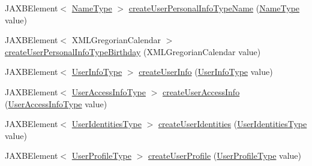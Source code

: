 \begin{DoxyCompactItemize}
\item 
JAXBElement$<$ \hyperlink{classcom_1_1telefonica_1_1schemas_1_1unica_1_1rest_1_1directory_1_1v1_1_1NameType}{NameType} $>$ \hyperlink{classcom_1_1telefonica_1_1schemas_1_1unica_1_1rest_1_1directory_1_1v1_1_1ObjectFactory_a7313963b96c9bc0f9e8525e5dd39c3fe}{createUserPersonalInfoTypeName} (\hyperlink{classcom_1_1telefonica_1_1schemas_1_1unica_1_1rest_1_1directory_1_1v1_1_1NameType}{NameType} value)
\item 
JAXBElement$<$ XMLGregorianCalendar $>$ \hyperlink{classcom_1_1telefonica_1_1schemas_1_1unica_1_1rest_1_1directory_1_1v1_1_1ObjectFactory_ac426ea74a4ed920175dd2dbf23597f1a}{createUserPersonalInfoTypeBirthday} (XMLGregorianCalendar value)
\item 
JAXBElement$<$ \hyperlink{classcom_1_1telefonica_1_1schemas_1_1unica_1_1rest_1_1directory_1_1v1_1_1UserInfoType}{UserInfoType} $>$ \hyperlink{classcom_1_1telefonica_1_1schemas_1_1unica_1_1rest_1_1directory_1_1v1_1_1ObjectFactory_a9afbbf7e2f5a284c3db8657162bce9df}{createUserInfo} (\hyperlink{classcom_1_1telefonica_1_1schemas_1_1unica_1_1rest_1_1directory_1_1v1_1_1UserInfoType}{UserInfoType} value)
\item 
JAXBElement$<$ \hyperlink{classcom_1_1telefonica_1_1schemas_1_1unica_1_1rest_1_1directory_1_1v1_1_1UserAccessInfoType}{UserAccessInfoType} $>$ \hyperlink{classcom_1_1telefonica_1_1schemas_1_1unica_1_1rest_1_1directory_1_1v1_1_1ObjectFactory_ae29f91baa40f31403604aeb9154745e0}{createUserAccessInfo} (\hyperlink{classcom_1_1telefonica_1_1schemas_1_1unica_1_1rest_1_1directory_1_1v1_1_1UserAccessInfoType}{UserAccessInfoType} value)
\item 
JAXBElement$<$ \hyperlink{classcom_1_1telefonica_1_1schemas_1_1unica_1_1rest_1_1directory_1_1v1_1_1UserIdentitiesType}{UserIdentitiesType} $>$ \hyperlink{classcom_1_1telefonica_1_1schemas_1_1unica_1_1rest_1_1directory_1_1v1_1_1ObjectFactory_a1e45690137de2177798c71138948e894}{createUserIdentities} (\hyperlink{classcom_1_1telefonica_1_1schemas_1_1unica_1_1rest_1_1directory_1_1v1_1_1UserIdentitiesType}{UserIdentitiesType} value)
\item 
JAXBElement$<$ \hyperlink{classcom_1_1telefonica_1_1schemas_1_1unica_1_1rest_1_1directory_1_1v1_1_1UserProfileType}{UserProfileType} $>$ \hyperlink{classcom_1_1telefonica_1_1schemas_1_1unica_1_1rest_1_1directory_1_1v1_1_1ObjectFactory_a2232a571deb3e468c6e0fb3415149318}{createUserProfile} (\hyperlink{classcom_1_1telefonica_1_1schemas_1_1unica_1_1rest_1_1directory_1_1v1_1_1UserProfileType}{UserProfileType} value)
\item 

\end{DoxyCompactItemize}
